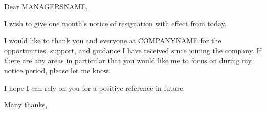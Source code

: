 \documentclass[a4paper]{letter}
\date{\displaydate{date}}
\begin{document}
\begin{letter}{}
\opening{Dear MANAGERSNAME,}

I wish to give one month's notice of resignation with effect from today.

I would like to thank you and everyone at COMPANYNAME for the opportunities,
support, and guidance I have received since joining the company. If there are
any areas in particular that you would like me to focus on during my notice
period, please let me know.

I hope I can rely on you for a positive reference in future.

\closing{Many thanks,}

\end{letter}
\end{document}
